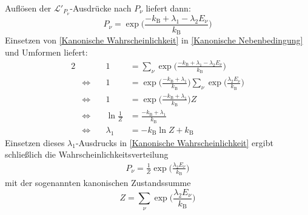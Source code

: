\documentclass[9pt]{report}
\begin{document}
Auflösen der $\mathcal{L}'_{P_{\nu}}$-Ausdrücke nach $P_{\nu}$ liefert dann:
\begin{equation}
P_{\nu}=\exp\Big(\frac{-k_{\mathrm{B}}+\lambda_1-\lambda_2E_{\nu}}{k_{\mathrm{B}}}\Big)\label{Kanonische Wahrscheinlichkeit}
\end{equation}
Einsetzen von \eqref{Kanonische Wahrscheinlichkeit} in \eqref{Kanonische Nebenbedingung} und Umformen liefert:
\begin{alignat*}{2}
&\qquad & 1 &= \sum_{\nu}\exp\Big(\frac{-k_{\mathrm{B}}+\lambda_1-\lambda_2E_{\nu}}{k_{\mathrm{B}}}\Big)\\[1pt]
&\Leftrightarrow & 1 &= \exp\Big(\frac{-k_{\mathrm{B}}+\lambda_1}{k_{\mathrm{B}}}\Big)\sum_{\nu}\exp\Big(\frac{\lambda_2E_{\nu}}{k_{\mathrm{B}}}\Big)\\
&\Leftrightarrow & 1 &= \exp\Big(\frac{-k_{\mathrm{B}}+\lambda_1}{k_{\mathrm{B}}}\Big)Z\\
&\Leftrightarrow & \ln\frac{1}{Z} &= \frac{-k_{\mathrm{B}}+\lambda_1}{k_{\mathrm{B}}}\\
&\Leftrightarrow & \lambda_1 &= -k_{\mathrm{B}}\ln Z+k_{\mathrm{B}}
\end{alignat*}
Einsetzen dieses $\lambda_1$-Ausdrucks in \eqref{Kanonische Wahrscheinlichkeit} ergibt schließlich die Wahrscheinlichkeitsverteilung
\begin{align}
P_{\nu}=\frac{1}{Z}\exp\Big(\frac{\lambda_2E_{\nu}}{k_{\mathrm{B}}}\Big)
\end{align}
mit der sogenannten kanonischen Zustandssumme
\begin{equation}
Z=\sum_{\nu}\exp\Big(\frac{\lambda_2E_{\nu}}{k_{\mathrm{B}}}\Big)
\end{equation}
\end{document}
